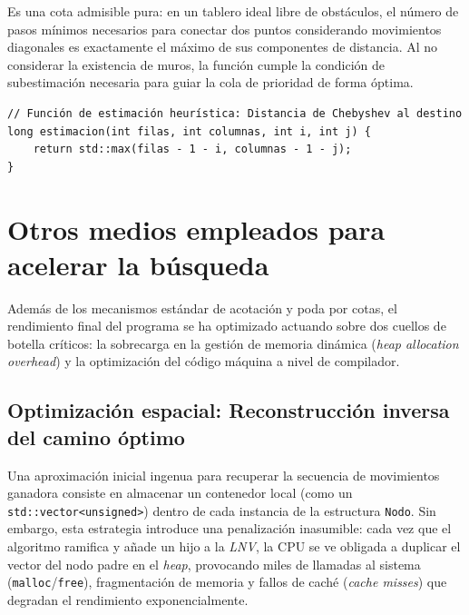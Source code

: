\documentclass[11pt,a4paper]{article}
\begin{document}
Es una cota admisible pura: en un tablero ideal libre de obstáculos, el número de pasos mínimos necesarios para conectar dos puntos considerando movimientos diagonales es exactamente el máximo de sus componentes de distancia. Al no considerar la existencia de muros, la función cumple la condición de subestimación necesaria para guiar la cola de prioridad de forma óptima.

\begin{lstlisting}[caption={Implementación analítica de la cota optimista}, label={lst:cota_optimista}]
// Función de estimación heurística: Distancia de Chebyshev al destino
long estimacion(int filas, int columnas, int i, int j) {
    return std::max(filas - 1 - i, columnas - 1 - j);
}
\end{lstlisting}


\section{Otros medios empleados para acelerar la búsqueda}
Además de los mecanismos estándar de acotación y poda por cotas, el rendimiento final del programa se ha optimizado actuando sobre dos cuellos de botella críticos: la sobrecarga en la gestión de memoria dinámica (\textit{heap allocation overhead}) y la optimización del código máquina a nivel de compilador.

\subsection{Optimización espacial: Reconstrucción inversa del camino óptimo}
Una aproximación inicial ingenua para recuperar la secuencia de movimientos ganadora consiste en almacenar un contenedor local (como un \texttt{std::vector<unsigned>}) dentro de cada instancia de la estructura \texttt{Nodo}. Sin embargo, esta estrategia introduce una penalización inasumible: cada vez que el algoritmo ramifica y añade un hijo a la \textit{LNV}, la CPU se ve obligada a duplicar el vector del nodo padre en el \textit{heap}, provocando miles de llamadas al sistema (\texttt{malloc}/\texttt{free}), fragmentación de memoria y fallos de caché (\textit{cache misses}) que degradan el rendimiento exponencialmente.
\end{document}
